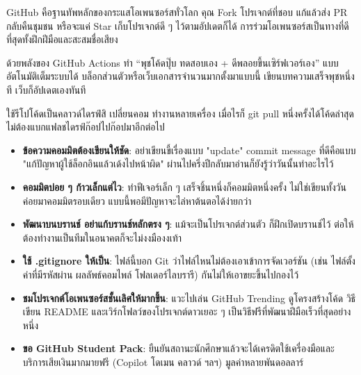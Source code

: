 
GitHub คือฐานทัพหลักของกระแสโอเพนซอร์สทั่วโลก คุณ Fork โปรเจกต์ที่ชอบ แก้แล้วส่ง PR กลับคืนชุมชน หรือจะแค่ Star เก็บโปรเจกต์ดี ๆ ไว้ตามอัปเดตก็ได้ การร่วมโอเพนซอร์สเป็นทางที่ดีที่สุดทั้งฝึกฝีมือและสะสมชื่อเสียง


ด้วยพลังของ GitHub Actions ทำ “พุชโค้ดปุ๊บ ทดสอบเอง + ดีพลอยขึ้นเซิร์ฟเวอร์เอง” แบบอัตโนมัติเต็มระบบได้ บล็อกส่วนตัวหรือเว็บเอกสารจำนวนมากตั้งมาแบบนี้ เขียนบทความเสร็จพุชหนึ่งที เว็บก็อัปเดตเองทันที


ใช้รีโปโค้ดเป็นคลาวด์ไดรฟ์สิ เปลี่ยนคอม ทำงานหลายเครื่อง เมื่อไรก็ git pull หนึ่งครั้งได้โค้ดล่าสุด ไม่ต้องแบกแฟลชไดรฟ์ก๊อปไปก๊อปมาอีกต่อไป


\begin{itemize}
  \item \textbf{ข้อความคอมมิตต้องเขียนให้ชัด}: อย่าเขียนขี้เรื่องแบบ "update" commit message ที่ดีคือแบบ "แก้ปัญหาผู้ใช้ล็อกอินแล้วเด้งไปหน้าผิด" ผ่านไปครึ่งปีกลับมาอ่านก็ยังรู้ว่าวันนั้นทำอะไรไว้
  \item \textbf{คอมมิตบ่อย ๆ ก้าวเล็กแต่ไว}: ทำฟีเจอร์เล็ก ๆ เสร็จชิ้นหนึ่งก็คอมมิตหนึ่งครั้ง ไม่ใช่เขียนทั้งวันค่อยมาคอมมิตรอบเดียว แบบนี้พอมีปัญหาจะไล่หาต้นตอได้ง่ายกว่า
  \item \textbf{พัฒนาบนบรานช์ อย่าแก้บรานช์หลักตรง ๆ}: แม้จะเป็นโปรเจกต์ส่วนตัว ก็ฝึกเปิดบรานช์ไว้ ต่อให้ต้องทำงานเป็นทีมในอนาคตก็จะไม่งงมืองงเท้า
  \item \textbf{ใช้ .gitignore ให้เป็น}: ไฟล์นี้บอก Git ว่าไฟล์ไหนไม่ต้องเอาเข้าการจัดเวอร์ชัน (เช่น ไฟล์ตั้งค่าที่มีรหัสผ่าน ผลลัพธ์คอมไพล์ โฟลเดอร์ไลบรารี) กันไม่ให้เอาขยะขึ้นไปกองไว้
  \item \textbf{ชมโปรเจกต์โอเพนซอร์สชั้นเลิศให้มากขึ้น}: แวะไปเล่น GitHub Trending ดูโครงสร้างโค้ด วิธีเขียน README และเวิร์กโฟลว์ของโปรเจกต์ดาวเยอะ ๆ เป็นวิธีฟรีที่พัฒนาฝีมือเร็วที่สุดอย่างหนึ่ง
  \item \textbf{ขอ GitHub Student Pack}: ยืนยันสถานะนักศึกษาแล้วจะได้เครดิตใช้เครื่องมือและบริการเสียเงินมากมายฟรี (Copilot โดเมน คลาวด์ ฯลฯ) มูลค่าหลายพันดอลลาร์
\end{itemize}

